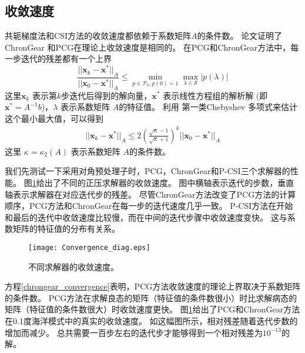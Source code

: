 \subsection{收敛速度} \label{solver:Algorithm:convergence_rate}

 
共轭梯度法和CSI方法的收敛速度都依赖于系数矩阵$A$的条件数。  
论文证明了 ChronGear  和PCG在理论上收敛速度是相同的。 
在PCG和ChronGear方法中，每一步迭代的残差都有一个上界\cite{Liesen2004}
\begin{equation}
\frac{||\textbf{x}_k-\textbf{x}^*||_A }{||\textbf{x}_0-\textbf{x}^*||_A}  \le \min_{p\in \mathcal{P}_k, p(0) = 1 }\max_{\lambda \in \mathcal{S}} |p(\lambda)| \label{PcgConvergeRate}
\end{equation}
这里$\textbf{x}_k$ 表示第$k$步迭代后得到的解向量，$\textbf{x}^*$ 表示线性方程组的解析解  (即$\textbf{x}^* = A^{-1}b$)，$\lambda$ 表示系数矩阵 $A$的特征值。
利用 第一类Chebyshev 多项式来估计这个最小最大值，可以得到 
\begin{align}
\label{chrongear_convergence}
||\textbf{x}_k-\textbf{x}^*||_A \le  2 (\frac{\sqrt{\kappa}-1}{\sqrt{\kappa}+1})^k ||\textbf{x}_0-\textbf{x}^*||_A
\end{align}
这里  $\kappa =  \kappa_2(A)$ 表示系数矩阵 $A$的条件数。

我们先测试一下采用对角预处理子时，PCG，ChronGear和P-CSI三个求解器的性能。
图\ref{fig:convergence_diag}给出了不同的正压求解器的收敛速度。
图中横轴表示迭代的步数，垂直轴表示求解器在对应迭代步的残差。 
尽管ChronGear方法改变了PCG方法的计算顺序，PCG方法和ChronGear在每一步的迭代速度几乎一致。
P-CSI方法在开始和最后的迭代中收敛速度比较慢，而在中间的迭代步骤中收敛速度变快。
这与系数矩阵的特征值的分布有关系。 
\begin {figure}
\vspace{10pt}
\centering
\texttt{[image: Convergence\_diag.eps]}
\caption[] {不同求解器的收敛速度。\label{fig:convergence_diag}}
\end{figure}

方程\ref{chrongear_convergence}表明，PCG方法收敛速度的理论上界取决于系数矩阵的条件数。 
PCG方法在求解良态的矩阵（特征值的条件数很小）时比求解病态的矩阵（特征值的条件数很大）时收敛速度更快。 
图\ref{fig:convergence_diag}给出了PCG和ChronGear方法在0.1度海洋模式中的真实的收敛速度。
如这幅图所示，相对残差随着迭代步数的增加而减少。
总共需要一百步左右的迭代步才能够得到一个相对残差为$10^{-13}$的解。
 

